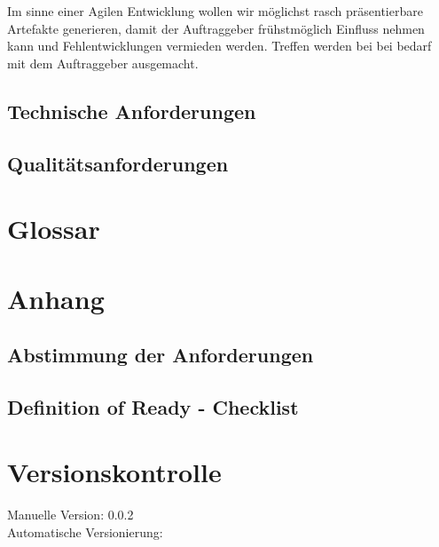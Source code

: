 \documentclass[11pt,titelpage]{scrreprt}
\begin{document}
Im sinne einer Agilen Entwicklung wollen wir möglichst rasch präsentierbare Artefakte generieren, damit der Auftraggeber frühstmöglich Einfluss nehmen kann und Fehlentwicklungen vermieden werden. Treffen werden bei bei bedarf mit dem Auftraggeber ausgemacht.


\subsection{Technische Anforderungen}
\subsection{Qualitätsanforderungen}
\section{Glossar}
\listoffigures
\listoftables

\section{Anhang}

\subsection{Abstimmung der Anforderungen}
\subsection{Definition of Ready - Checklist}
\section{Versionskontrolle}
Manuelle Version: 0.0.2
\\

\noindent
Automatische Versionierung:
%

\immediate{}

\immediate{}
\end{document}
